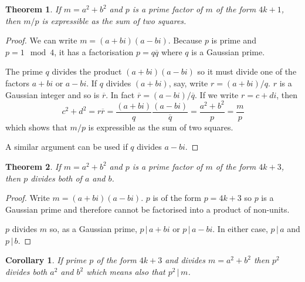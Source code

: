 \documentclass[11pt]{amsart}
\newtheorem{theorem}{Theorem}[section]
\newtheorem{corollary}{Corollary}[section]
\begin{document}
\vspace{1em}

\begin{theorem}
\label{thm:m_over_p_is_sum_of_two_squares}
If $m = a^{2} + b^{2}$ and $p$ is a prime factor of $m$ of the form $4k+1$, then $m/p$ is expressible as the sum of two squares.
\end{theorem}

\begin{proof}
We can write $m = (a+b i) ( a - b i)$. Because $p$ is prime and $p = 1 \mod 4$, it has a factorisation $p = q \overline{q}$ 
where $q$ is a Gaussian prime.

The prime $q$ divides the product $(a+b i) ( a - b i)$ so it must divide one of the factors $a+bi$ or $a-bi$. If $q$ divides $(a+bi)$, say,  write $r = (a+bi) / q$. $r$ is a Gaussian integer and so is $\overline{r}$. In fact $\overline{r} = (a-bi) / \overline{q}$. If we write  $r = c + d i$, then 
$$
c^{2} + d^{2} = r \overline{r} = \frac{(a + b i)}{q} \frac{(a - b i)}{\overline{q}}= \frac{a^{2}+b^{2}}{p} = \frac{m}{p}
$$
which shows that $m/p$ is expressible as the sum of two squares.

A similar argument can be used if $q$ divides $a-bi$.
\end{proof}


\vspace{1em}

\begin{theorem}
\label{thm:pIs4kPlus3AndDividesBothAandB}
If $m = a^{2} + b^{2}$ and $p$ is a prime factor of $m$ of the form $4k+3$, then $p$ divides both of $a$ and $b$.
\end{theorem}

\begin{proof}

Write $m = (a + b i) (a - b i)$. $p$ is of the form $p=4k+3$ so $p$ is a Gaussian prime and therefore cannot be factorised into a product of non-units.

 $p$ divides $m$ so, as a Gaussian prime, $p \, | \, a + b i$
or $p \, | \, a - b i$. In either case, $p \, | \, a $ and $p \, | \, b $.

\end{proof}

\vspace{1em}

\begin{corollary}
\label{cor:pSquaredDivM}
If prime $p$ of the form $4k+3$ and divides $m = a^{2} + b^{2}$ then $p^{2}$ divides both $a^{2}$ and $b^{2}$ which means also that $p^{2} \, | \, m$.
\end{corollary}
\end{document}
